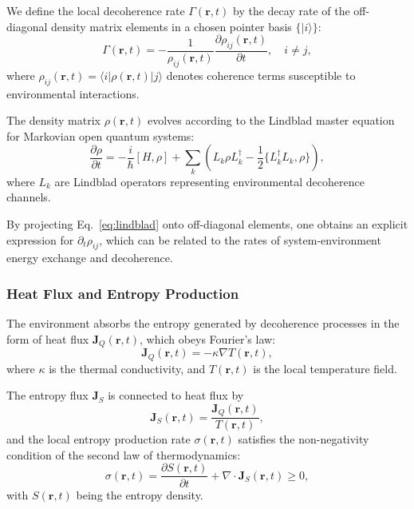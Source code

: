 \documentclass[12pt]{article}
\begin{document}
We define the local decoherence rate \(\Gamma(\mathbf{r}, t)\) by the decay rate of the off-diagonal density matrix elements in a chosen pointer basis \(\{ |i\rangle \}\):
\begin{equation}
\Gamma(\mathbf{r}, t) = -\frac{1}{\rho_{ij}(\mathbf{r}, t)} \frac{\partial \rho_{ij}(\mathbf{r}, t)}{\partial t}, \quad i \neq j,
\label{eq:decoherence_rate}
\end{equation}
where \(\rho_{ij}(\mathbf{r}, t) = \langle i | \rho(\mathbf{r}, t) | j \rangle\) denotes coherence terms susceptible to environmental interactions.

The density matrix \(\rho(\mathbf{r}, t)\) evolves according to the Lindblad master equation for Markovian open quantum systems:
\begin{equation}
\frac{\partial \rho}{\partial t} = -\frac{i}{\hbar}[H, \rho] + \sum_k \left( L_k \rho L_k^\dagger - \frac{1}{2} \{ L_k^\dagger L_k, \rho \} \right),
\label{eq:lindblad}
\end{equation}
where \(L_k\) are Lindblad operators representing environmental decoherence channels.

By projecting Eq.~\eqref{eq:lindblad} onto off-diagonal elements, one obtains an explicit expression for \(\partial_t \rho_{ij}\), which can be related to the rates of system-environment energy exchange and decoherence.

\subsubsection*{Heat Flux and Entropy Production}

The environment absorbs the entropy generated by decoherence processes in the form of heat flux \(\mathbf{J}_Q(\mathbf{r}, t)\), which obeys Fourier’s law:
\begin{equation}
\mathbf{J}_Q(\mathbf{r}, t) = - \kappa \nabla T(\mathbf{r}, t),
\label{eq:fourier_heat_flux}
\end{equation}
where \(\kappa\) is the thermal conductivity, and \(T(\mathbf{r}, t)\) is the local temperature field.

The entropy flux \(\mathbf{J}_S\) is connected to heat flux by
\begin{equation}
\mathbf{J}_S(\mathbf{r}, t) = \frac{\mathbf{J}_Q(\mathbf{r}, t)}{T(\mathbf{r}, t)},
\label{eq:entropy_flux}
\end{equation}
and the local entropy production rate \(\sigma(\mathbf{r}, t)\) satisfies the non-negativity condition of the second law of thermodynamics:
\begin{equation}
\sigma(\mathbf{r}, t) = \frac{\partial S(\mathbf{r}, t)}{\partial t} + \nabla \cdot \mathbf{J}_S(\mathbf{r}, t) \geq 0,
\label{eq:entropy_production}
\end{equation}
with \(S(\mathbf{r}, t)\) being the entropy density.
\end{document}
